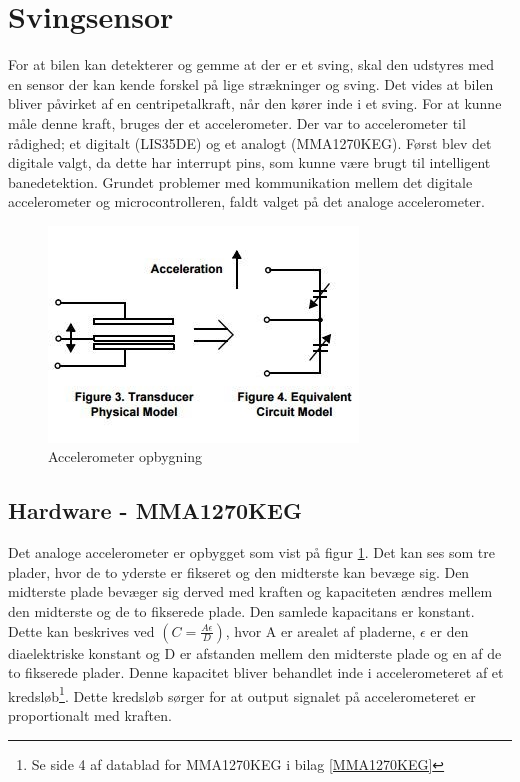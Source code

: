 \section{Svingsensor}
\label{svingsensor}
For at bilen kan detekterer og gemme at der er et sving, skal den udstyres med en sensor der kan kende forskel på lige strækninger og sving. Det vides at bilen bliver påvirket af en centripetalkraft, når den kører inde i et sving. For at kunne måle denne kraft, bruges der et accelerometer. Der var to accelerometer til rådighed; et digitalt (LIS35DE) og et analogt (MMA1270KEG). Først blev det digitale valgt, da dette har interrupt pins, som kunne være brugt til intelligent banedetektion. Grundet problemer med kommunikation mellem det digitale accelerometer og microcontrolleren, faldt valget på det analoge accelerometer.

\begin{figure}[h!]
\center
\includegraphics[scale=1]{./Graphics/Acceleration}
\caption{Accelerometer opbygning}
\label{Acceleration}
\end{figure}

\subsection{Hardware - MMA1270KEG}
Det analoge accelerometer er opbygget som vist på figur \ref{Acceleration}. Det kan ses som tre plader, hvor de to yderste er fikseret og den midterste kan bevæge sig. Den midterste plade bevæger sig derved med kraften og kapaciteten ændres mellem den midterste og de to fikserede plade. Den samlede kapacitans er konstant. Dette kan beskrives ved $(C=\frac{A\epsilon}{D})$, hvor A er arealet af pladerne, $\epsilon$ er den diaelektriske konstant og D er afstanden mellem den midterste plade og en af de to fikserede plader. Denne kapacitet bliver behandlet inde i accelerometeret af et kredsløb\footnote{Se side 4 af datablad for MMA1270KEG i bilag \ref{MMA1270KEG}}. Dette kredsløb sørger for at output signalet på accelerometeret er proportionalt med kraften.

